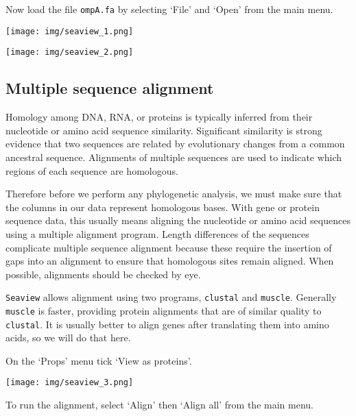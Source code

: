 \documentclass[11pt]{article}
\begin{document}
    Now load the file \texttt{ompA.fa} by selecting `File' and `Open' from
the main menu.


\begin{center}
\texttt{[image: img/seaview\_1.png]}
\end{center}



\begin{center}
\texttt{[image: img/seaview\_2.png]}
\end{center}


    \hypertarget{multiple-sequence-alignment}{%
\subsection{Multiple sequence
alignment}\label{multiple-sequence-alignment}}

Homology among DNA, RNA, or proteins is typically inferred from their
nucleotide or amino acid sequence similarity. Significant similarity is
strong evidence that two sequences are related by evolutionary changes
from a common ancestral sequence. Alignments of multiple sequences are
used to indicate which regions of each sequence are homologous.

Therefore before we perform any phylogenetic analysis, we must make sure
that the columns in our data represent homologous bases. With gene or
protein sequence data, this usually means aligning the nucleotide or
amino acid sequences using a multiple alignment program. Length
differences of the sequences complicate multiple sequence alignment
because these require the insertion of gaps into an alignment to ensure
that homologous sites remain aligned. When possible, alignments should
be checked by eye.

\texttt{Seaview} allows alignment using two programs, \texttt{clustal}
and \texttt{muscle}. Generally \texttt{muscle} is faster, providing
protein alignments that are of similar quality to \texttt{clustal}. It
is usually better to align genes after translating them into amino
acids, so we will do that here.

    On the `Props' menu tick `View as proteins'.


\begin{center}
\texttt{[image: img/seaview\_3.png]}
\end{center}


    To run the alignment, select `Align' then `Align all' from the main
menu.
\end{document}
